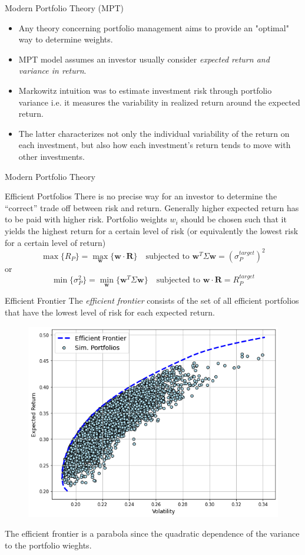 \documentclass{beamer}
\begin{document}
\begin{frame}{Modern Portfolio Theory (MPT)}
  \begin{itemize}
  \item Any theory concerning portfolio management aims to provide an "optimal" way to determine weights.
  \item MPT model assumes an investor usually consider \emph{expected return and variance in return}.
  \item Markowitz intuition was to estimate investment risk through portfolio variance i.e. it measures the variability in realized return around the expected return.  
  \item The latter characterizes not only the individual variability of the return on each investment, but also how each investment’s return tends to move with other investments. 
  \end{itemize}
\end{frame}

\begin{frame}{Modern Portfolio Theory}
  \begin{block}{Efficient Portfolios}
    There is no precise way for an investor to determine the “correct” trade off between risk and return. Generally higher expected return has to be paid with higher risk. Portfolio weights $w_i$ should be chosen such that it yields the highest return for a certain level of risk (or equivalently the lowest risk for a certain level of return)
    \begin{equation*}
      \max\{R_P\} = \underset{\mathbf{w}}{\max}\{\mathbf{w}\cdot\mathbf{R}\}\quad\textrm{subjected to }\mathbf{w}^T\Sigma\mathbf{w} = (\sigma_P^{target})^2
    \end{equation*}
or
    \begin{equation*}
      \min\{\sigma_P^2\}= \underset{\mathbf{w}}{\min}\{\mathbf{w}^T\Sigma\mathbf{w}\}\quad\textrm{subjected to }\mathbf{w}\cdot\mathbf{R} = R_P^{target}
    \end{equation*}
  \end{block}
\end{frame}

\begin{frame}{Efficient Frontier}
  The \emph{efficient frontier} consists of the set of all efficient portfolios that have the lowest level of risk for each expected return.
  \begin{figure}[h]
    \begin{center}
      \includegraphics[width=0.4\linewidth]{efficient_frontier}
    \end{center}
  \end{figure}
  The efficient frontier is a parabola since the quadratic dependence of the variance to the portfolio wieghts.
\end{frame}
\end{document}
